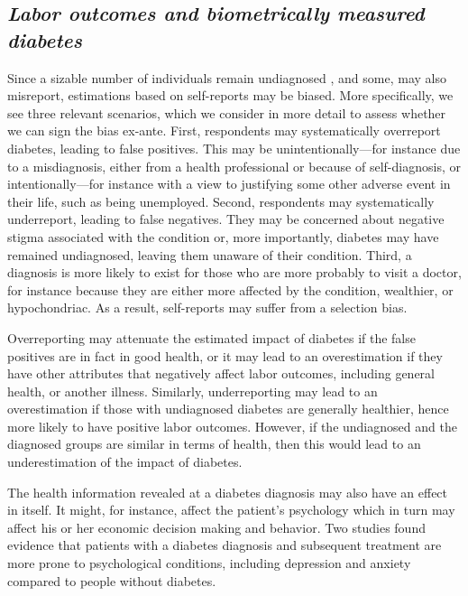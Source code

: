 \documentclass[12pt,english]{article}
\begin{document}
\subsection{\label{sec:Biomarker Strategy}\textit{Labor outcomes and biometrically measured diabetes}}

Since a sizable number of individuals remain undiagnosed , and some, may also misreport, estimations based on self-reports may be biased. More specifically, we see three relevant scenarios, which we consider in more detail to assess whether we can sign the bias ex-ante. First, respondents may systematically overreport diabetes, leading to false positives. This may be unintentionally---for instance due to a misdiagnosis, either from a health professional or because of self-diagnosis, or intentionally---for instance with a view to justifying some other adverse event in their life, such as being unemployed. Second, respondents may systematically underreport, leading to false negatives. They may be concerned about negative stigma associated with the condition or, more importantly, diabetes may have remained undiagnosed, leaving them unaware of their condition. Third, a diagnosis is more likely to exist for those who are more probably to visit a doctor, for instance because they are either more affected by the condition, wealthier, or hypochondriac. As a result, self-reports may suffer from a selection bias.

Overreporting may attenuate the estimated impact of diabetes if the false positives are in fact in good health, or it may lead to an overestimation if they have other attributes that negatively affect labor outcomes, including general health, or another illness. Similarly, underreporting may lead to an overestimation if those with undiagnosed diabetes are generally healthier, hence more likely to have positive labor outcomes. However, if the undiagnosed and the diagnosed groups are similar in terms of health, then this would lead to an underestimation of the impact of diabetes. 

The health information revealed at a diabetes diagnosis may also have an effect in itself. It might, for instance, affect the patient's psychology which in turn may affect his or her economic decision making and behavior. Two studies found evidence that patients with a diabetes diagnosis and subsequent treatment are more prone to psychological conditions, including depression and anxiety \parencite{Thoolen2006,Paddison2011} compared to people without diabetes.
\end{document}
